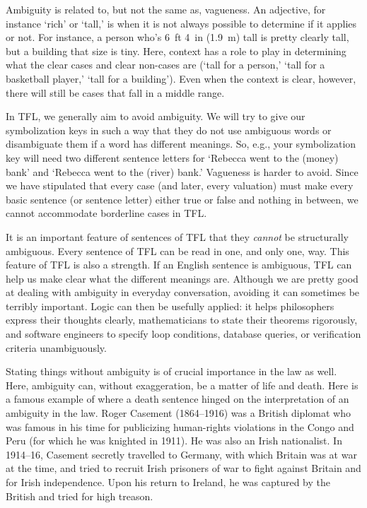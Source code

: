 Ambiguity is related to, but not the same as, vagueness. An adjective, for instance `rich' or `tall,' is  when it is not always possible to determine if it applies or not.  For instance, a person who's 6~ft 4~in (1.9~m) tall is pretty clearly tall, but a building that size is tiny.  Here, context has a role to play in determining what the clear cases and clear non-cases are (`tall for a person,' `tall for a basketball player,' `tall for a building'). Even when the context is clear, however, there will still be cases that fall in a middle range.

In TFL, we generally aim to avoid ambiguity. We will try to give our symbolization keys in such a way that they do not use ambiguous words or  disambiguate them if a word has different meanings. So, e.g., your symbolization key will need two different sentence letters for `Rebecca went to the (money) bank' and `Rebecca went to the (river) bank.' Vagueness is harder to avoid. Since we have stipulated that every case (and later, every valuation) must make every basic sentence (or sentence letter) either true or false and nothing in between, we cannot accommodate borderline cases in TFL.

It is an important feature of sentences of TFL that they \emph{cannot} be structurally ambiguous. Every sentence of TFL can be read in one, and only one, way. This feature of TFL is also a strength. If an English sentence is ambiguous, TFL can help us make clear what the different meanings are.  Although we are pretty good at dealing with ambiguity in everyday conversation, avoiding it can sometimes be terribly important. Logic can then be usefully applied: it helps philosophers express their thoughts clearly, mathematicians to state their theorems rigorously, and software engineers to specify loop conditions, database queries, or verification criteria unambiguously.

Stating things without ambiguity is of crucial importance in the law as well. Here, ambiguity can, without exaggeration, be a matter of life and death. Here is a famous example of where a death sentence hinged on the interpretation of an ambiguity in the law. Roger Casement (1864--1916) was a British diplomat who was famous in his time for publicizing human-rights violations in the Congo and Peru (for which he was knighted in 1911). He was also an Irish nationalist. In 1914--16, Casement secretly travelled to Germany, with which Britain was at war at the time, and tried to recruit Irish prisoners of war to fight against Britain and for Irish independence. Upon his return to Ireland, he was captured by the British and tried for high treason.

